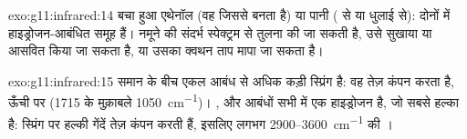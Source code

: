\begin{solution}{exo:g11:infrared:14}
बचा हुआ एथेनॉल (वह  जिससे  बनता है) या पानी ( से
या धुलाई से): दोनों में हाइड्रोजन-आबंधित  समूह हैं।
नमूने की संदर्भ स्पेक्ट्रम से तुलना की जा सकती है, उसे सुखाया या आसवित किया जा सकता है, या
उसका क्वथन ताप मापा जा सकता है।
\end{solution}

\begin{solution}{exo:g11:infrared:15}
समान  के बीच  एकल आबंध से अधिक कड़ी स्प्रिंग है:
वह तेज़ कंपन करता है, ऊँची  पर (1715 के मुक़ाबले
\qty{1050}{cm^{-1}})। ,  और  आबंधों सभी में
एक हाइड्रोजन  है, जो सबसे हल्का है: स्प्रिंग पर हल्की गेंदें
तेज़ कंपन करती हैं, इसलिए लगभग 2900--\qty{3600}{cm^{-1}} की ।
\end{solution}

